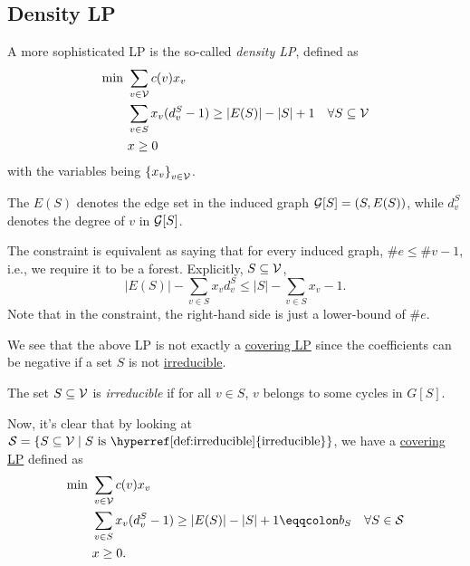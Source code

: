 \subsection{Density LP}

A more sophisticated LP is the so-called \emph{density LP}, defined as
\[
	\begin{aligned}
		\min~ & \sum_{v\in \mathcal{\MakeUppercase{v}} } c(v) x_v                                                                                                  \\
		      & \sum_{v\in S} x_v(d_v^{S} - 1) \geq \left\vert E(S) \right\vert - \left\vert S \right\vert + 1\quad \forall S\subseteq \mathcal{\MakeUppercase{v}} \\
		      & x\geq 0
	\end{aligned}
\]
with the variables being \(\left\{ x_v \right\} _{v\in \mathcal{\MakeUppercase{v}} }\).

\begin{notation}
	The \(E(S)\) denotes the edge set in the induced graph \(\mathcal{\MakeUppercase{g}} [S] = (S, E(S))\), while \(d_v^S\) denotes the degree of \(v\) in \(\mathcal{\MakeUppercase{g}} [S]\).
\end{notation}

\begin{intuition}
	The constraint is equivalent as  saying that for every induced graph, \(\# e \leq \# v - 1\), i.e., we require it to be a forest. Explicitly, \(S\subseteq \mathcal{\MakeUppercase{v}} \),
	\[
		\left\vert E(S) \right\vert - \sum_{v\in S} x_v d_v^S\leq \left\vert S \right\vert - \sum_{v\in S}x_v - 1.
	\]
	Note that in the constraint, the right-hand side is just a lower-bound of \(\# e\).
\end{intuition}

We see that the above LP is not exactly a \hyperref[def:covering-LP]{covering LP} since the coefficients can be negative if a set \(S\) is not \hyperref[def:irreducible]{irreducible}.

\begin{definition}[Irreducible]\label{def:irreducible}
	The set \(S\subseteq \mathcal{\MakeUppercase{v}} \) is \emph{irreducible} if for all \(v\in S\), \(v\) belongs to some cycles in \(G[S]\).
\end{definition}

Now, it's clear that by looking at \(\mathcal{\MakeUppercase{S}} = \left\{ S\subseteq \mathcal{\MakeUppercase{v}} \mid S \text{ is \hyperref[def:irreducible]{irreducible}}\right\} \), we have a \hyperref[def:covering-LP]{covering LP} defined as
\[
	\begin{aligned}
		\min~ & \sum_{v\in \mathcal{\MakeUppercase{v}} } c(v) x_v                                                                                                          \\
		      & \sum_{v\in S} x_v(d_v^{S} - 1) \geq \left\vert E(S) \right\vert - \left\vert S \right\vert + 1 \eqqcolon b_S\quad \forall S\in \mathcal{\MakeUppercase{S}} \\
		      & x\geq 0.
	\end{aligned}
\]

